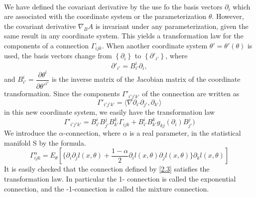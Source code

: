   \paragraph{} We have defined the covariant derivative by the use fo the basis vectors $\partial_i$ which are
  associated with the coordinate system or the parameterization $\theta$. However, the covariant derivative 
  $\nabla_B A$ is invariant under any parameterization, given the same result in any coordinate system.
  This yields a transformation law for the components of a connection $\Gamma_{ijk}$. When another coordinate system $\theta' = \theta'(\theta)$
  is used, the basis vectors change from $\left\lbrace \partial_i \right\rbrace$ to $\left\lbrace \partial '_{i'} 
  \right\rbrace$, where 
  \begin{equation*}
   \partial '_{i'} = B^i_{i'} \partial_{i},
  \end{equation*}
and $B^i_{i'} = \dfrac{\partial \theta^{i}}{\partial \theta '^{i'}}$ is the inverse matrix of the 
Jacobian matrix of the coordinate transformation. Since the components $\Gamma'_{i'j'k'}$ of the 
connection are written as 
\begin{equation*}
 \Gamma'_{i'j'k'} = \langle \nabla \partial_{i'} \partial_{j'}, \partial_{k'} \rangle
\end{equation*}
in this new coordinate system, we easily have the transformation law 
\begin{equation*}
 \Gamma'_{i'j'k'} = B^{i}_{i'}B^{j}_{j'}B^k_{k'}\Gamma_{ijk} + B^{i}_{i'}B^{k}_{k'}g_{kj}(\partial_i)B^{j}_{j'})
\end{equation*}
   We introduce the $\alpha$-connection, where $\alpha$ is a real parameter, in the statistical manifold S by the 
 formula.
 \begin{equation}\label{2.3}
  \Gamma^{\alpha}_{ijk} = E_{\theta} [ \{\partial_i\partial_j l(x,\theta) + \dfrac{1 - \alpha}{2} \partial_il(x,\theta)
  \partial_j l(x,\theta)\} \partial_k l(x,\theta)]
 \end{equation}
It is easily checked that the connection defined by \ref{2.3} satisfies the transformation law. In particular the 1- connection is called the exponential
connection, and the -1-connection is called the mixture connection.
